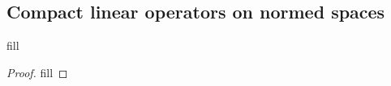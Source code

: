 \subsection{Compact linear operators on normed spaces}

\begin{exercise}{1}
fill
\end{exercise}
\begin{proof}
fill
\end{proof}